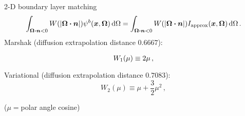 \documentclass[draft]{beamer}
\begin{document}
%
%  

\begin{frame}{2-D boundary layer matching}
\begin{equation*}
\int_{\bm{\Omega}\bm{\cdot}\bm{n} < 0} W( \left| \bm{\Omega}\bm{\cdot}\bm{n} \right|)
\psi^b(\bm{x}, \bm{\Omega}) \mathop{}\!\mathrm{d}\Omega
=
\int_{\bm{\Omega}\bm{\cdot}\bm{n} < 0} W( \left| \bm{\Omega}\bm{\cdot}\bm{n} \right|)
I_\text{approx}(\bm{x}, \bm{\Omega}) \mathop{}\!\mathrm{d}\Omega \,.
\end{equation*}
Marshak (diffusion extrapolation distance $0.6667$):
\begin{equation*}
  W_1(\mu) \equiv \vphantom{\frac12} 2 \mu \,,
\end{equation*}
Variational (diffusion extrapolation distance $0.7083$):
\begin{equation*}
   W_2(\mu) \equiv \mu + \frac{3}{2} \mu^2 \,,
\end{equation*}

($\mu={}$polar angle cosine)
\end{frame}
\end{document}

